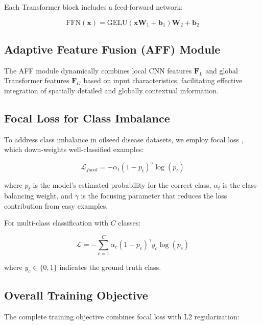 \documentclass[default, iicol]{sn-jnl}
\theoremstyle{thmstyleone}%
\theoremstyle{thmstyletwo}%
\theoremstyle{thmstylethree}%
\begin{document}
Each Transformer block includes a feed-forward network:

\begin{equation}
\text{FFN}(\mathbf{x}) = \text{GELU}(\mathbf{x}\mathbf{W}_1 + \mathbf{b}_1)\mathbf{W}_2 + \mathbf{b}_2
\label{eq:ffn}
\end{equation}

\subsection{Adaptive Feature Fusion (AFF) Module}

The AFF module dynamically combines local CNN features $\mathbf{F}_L$ and global Transformer features $\mathbf{F}_G$ based on input characteristics, facilitating effective integration of spatially detailed and globally contextual information.

\subsection{Focal Loss for Class Imbalance}

To address class imbalance in oilseed disease datasets, we employ focal loss \cite{lin2017focal}, which down-weights well-classified examples:

\begin{equation}
\mathcal{L}_{focal} = -\alpha_t (1-p_t)^\gamma \log(p_t)
\label{eq:focal_loss}
\end{equation}

where $p_t$ is the model's estimated probability for the correct class, $\alpha_t$ is the class-balancing weight, and $\gamma$ is the focusing parameter that reduces the loss contribution from easy examples.

For multi-class classification with $C$ classes:

\begin{equation}
\mathcal{L} = -\sum_{c=1}^{C} \alpha_c (1-p_c)^\gamma y_c \log(p_c)
\label{eq:multiclass_focal}
\end{equation}

where $y_c \in \{0,1\}$ indicates the ground truth class.

\subsection{Overall Training Objective}

The complete training objective combines focal loss with L2 regularization:
\end{document}
